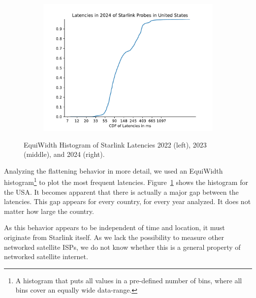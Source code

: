 \begin{figure}
\begin{subfigure}[b]{0.3\linewidth}
		\includegraphics[width=\linewidth]{chapters/4-results/latency/img/cdf_latencies_in_2024_of_starlink_probes_in_united_states.pdf}
	\end{subfigure}
	\caption{EquiWidth Histogram of Starlink Latencies 2022 (left), 2023 (middle), and 2024 (right).}
	\label{fig:latency-histogram-usa}
\end{figure}

Analyzing the flattening behavior in more detail, we used an EquiWidth histogram\footnote{A histogram that puts all values in a pre-defined number of bins, where all bins cover an equally wide data-range.} to plot the most frequent latencies. Figure~\ref{fig:latency-histogram-usa} shows the histogram for the USA. It becomes apparent that there is actually a major gap between the latencies.
This gap appears for every country, for every year analyzed. It does not matter how large the country.

As this behavior appears to be independent of time and location, it must originate from Starlink itself. As we lack the possibility to measure other networked satellite ISPs, we do not know whether this is a general property of networked satellite internet.

